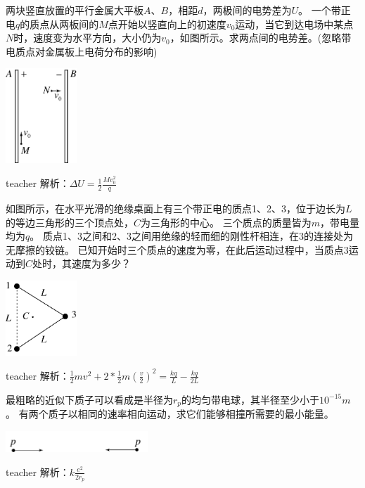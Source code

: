 \begin{example}
两块竖直放置的平行金属大平板$A$、$B$，相距$d$，两极间的电势差为$U$。
一个带正电$q$的质点从两板间的$M$点开始以竖直向上的初速度$v_0$运动，当它到达电场中某点$N$时，速度变为水平方向，大小仍为$v_0$，如图所示。求两点间的电势差。(忽略带电质点对金属板上电荷分布的影响)
\begin{flushright}
\includegraphics[width=0.2\textwidth]{images/elec-problem-1.pdf}
\end{flushright}
\begin{taggedblock}{teacher}
\noindent
解析：$\Delta U=\frac{1}{2}\frac{Mv_0^2}{q}$
\end{taggedblock}
\end{example}

\begin{example}
如图所示，在水平光滑的绝缘桌面上有三个带正电的质点1、2、3，位于边长为$L$的等边三角形的三个顶点处，$C$为三角形的中心。
三个质点的质量皆为$m$，带电量均为$q$。
质点1、3之间和2、3之间用绝缘的轻而细的刚性杆相连，在3的连接处为无摩擦的铰链。
已知开始时三个质点的速度为零，在此后运动过程中，当质点3运动到$C$处时，其速度为多少？
\begin{flushright}
\includegraphics[width=0.2\textwidth]{images/elec-problem-10.pdf}
\end{flushright}
\begin{taggedblock}{teacher}
\noindent
解析：$\frac{1}{2}mv^2+2*\frac{1}{2}m(\frac{v}{2})^2=\frac{kq}{L}-\frac{kq}{2L}$
\end{taggedblock}
\end{example}

\begin{example}
最粗略的近似下质子可以看成是半径为$r_p$的均匀带电球，其半径至少小于$10^{-15}\unit{m}$。
有两个质子以相同的速率相向运动，求它们能够相撞所需要的最小能量。
\begin{flushright}
\includegraphics[width=0.4\textwidth]{images/elec-problem-9.pdf}
\end{flushright}
\begin{taggedblock}{teacher}
\noindent
解析：$k\frac{e^2}{2r_p}$
\end{taggedblock}
\end{example}


